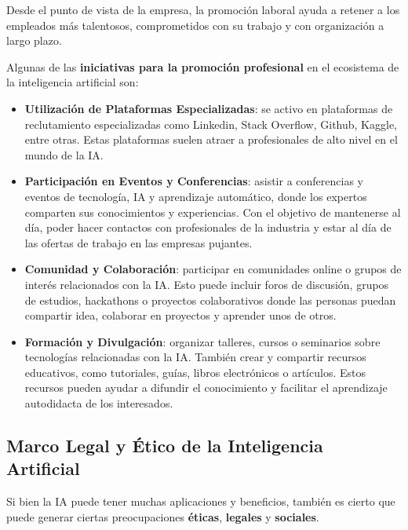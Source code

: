 Desde el punto de vista de la empresa, la promoción laboral ayuda a retener a los empleados más talentosos, comprometidos con su trabajo y con organización a largo plazo. 

Algunas de las \textbf{iniciativas para la promoción profesional} en el ecosistema de la inteligencia artificial son:

\begin{itemize}
	\item \textbf{Utilización de Plataformas Especializadas}: se activo en plataformas de reclutamiento especializadas como Linkedin, Stack Overflow, Github, Kaggle, entre otras. Estas plataformas suelen atraer a profesionales de alto nivel en el mundo de la IA.
	
	\item \textbf{Participación en Eventos y Conferencias}: asistir a conferencias y eventos de tecnología, IA y aprendizaje automático, donde los expertos comparten sus conocimientos y experiencias. Con el objetivo de mantenerse al día, poder hacer contactos con profesionales de la industria y estar al día de las ofertas de trabajo en las empresas pujantes.
	
	\item \textbf{Comunidad y Colaboración}: participar en comunidades online o grupos de interés relacionados con la IA. Esto puede incluir foros de discusión, grupos de estudios, hackathons o proyectos colaborativos donde las personas puedan compartir idea, colaborar en proyectos y aprender unos de otros.
	
	\item \textbf{Formación y Divulgación}: organizar talleres, cursos o seminarios sobre tecnologías relacionadas con la IA. También crear y compartir recursos educativos, como tutoriales, guías, libros electrónicos o artículos. Estos recursos pueden ayudar a difundir el conocimiento y facilitar el aprendizaje autodidacta de los interesados.
\end{itemize}

\subsection{Marco Legal y Ético de la Inteligencia Artificial}
Si bien la IA puede tener muchas aplicaciones y beneficios, también es cierto que puede generar ciertas preocupaciones \textbf{éticas}, \textbf{legales} y \textbf{sociales}. 

